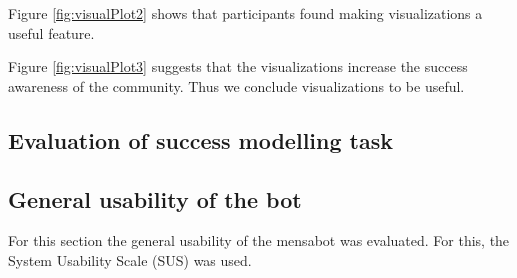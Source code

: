 

Figure \ref{fig:visualPlot2} shows that participants found making visualizations a useful feature. 



Figure \ref{fig:visualPlot3} suggests that the visualizations increase the success awareness of the community. Thus we conclude visualizations to be useful.

\subsection{Evaluation of success modelling task}

\subsection{General usability of the bot}
For this section the general usability of the mensabot was evaluated. For this, the System Usability Scale (SUS) was used.